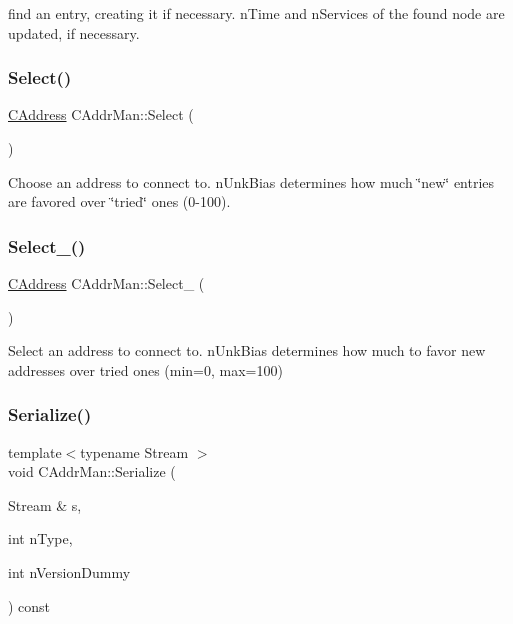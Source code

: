 find an entry, creating it if necessary. n\+Time and n\+Services of the found node are updated, if necessary. \mbox{\label{class_c_addr_man_ae4b1b65cc15f9a12f90db362fb9c8488}} 
\subsubsection{\texorpdfstring{Select()}{Select()}}
{\footnotesize\ttfamily \mbox{\hyperlink{class_c_address}{C\+Address}} C\+Addr\+Man\+::\+Select (\begin{DoxyParamCaption}{ }\end{DoxyParamCaption})\hspace{0.3cm}{\ttfamily [inline]}}

Choose an address to connect to. n\+Unk\+Bias determines how much \char`\"{}new\char`\"{} entries are favored over \char`\"{}tried\char`\"{} ones (0-\/100). \mbox{\label{class_c_addr_man_af34f24d32505ff3590cbacbc4cc4c09e}} 
\subsubsection{\texorpdfstring{Select\+\_\+()}{Select\_()}}
{\footnotesize\ttfamily \mbox{\hyperlink{class_c_address}{C\+Address}} C\+Addr\+Man\+::\+Select\+\_\+ (\begin{DoxyParamCaption}{ }\end{DoxyParamCaption})\hspace{0.3cm}{\ttfamily [protected]}}

Select an address to connect to. n\+Unk\+Bias determines how much to favor new addresses over tried ones (min=0, max=100) \mbox{\label{class_c_addr_man_a08668d8cf435750a80316b4708bbc9eb}} 
\subsubsection{\texorpdfstring{Serialize()}{Serialize()}}
{\footnotesize\ttfamily template$<$typename Stream $>$ \\
void C\+Addr\+Man\+::\+Serialize (\begin{DoxyParamCaption}\item[{Stream \&}]{s,  }\item[{int}]{n\+Type,  }\item[{int}]{n\+Version\+Dummy }\end{DoxyParamCaption}) const\hspace{0.3cm}{\ttfamily [inline]}}

